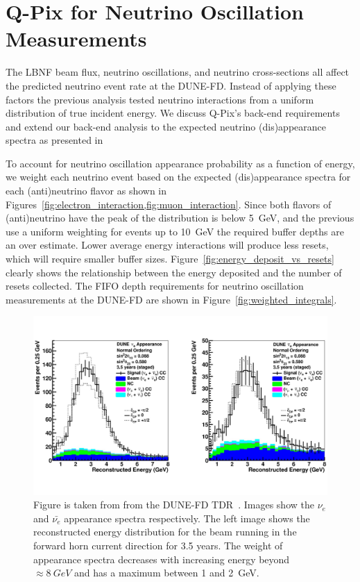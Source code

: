 \section{Q-Pix for Neutrino Oscillation Measurements}
The LBNF beam flux, neutrino oscillations, and neutrino cross-sections all affect the predicted neutrino event rate at the DUNE-FD.
Instead of applying these factors the previous analysis tested neutrino interactions from a uniform distribution of true incident energy.
We discuss Q-Pix's back-end requirements and extend our back-end analysis to the expected neutrino (dis)appearance spectra as presented in~\citep{DUNE_FD_TDRv2_2020}

To account for neutrino oscillation appearance probability as a function of energy, we weight each neutrino event based on the expected (dis)appearance spectra for each (anti)neutrino flavor as shown in Figures~\cref{fig:electron_interaction,fig:muon_interaction}.
Since both flavors of (anti)neutrino have the peak of the distribution is below 5~\unit{GeV}, and the previous use a uniform weighting for events up to 10~\unit{GeV} the required buffer depths are an over estimate.
Lower average energy interactions will produce less resets, which will require smaller buffer sizes.
Figure~\ref{fig:energy_deposit_vs_resets} clearly shows the relationship between the energy deposited and the number of resets collected.
The FIFO depth requirements for neutrino oscillation measurements at the DUNE-FD are shown in Figure~\ref{fig:weighted_integrals}.

\begin{figure}[]
\centering
\includegraphics[width=\textwidth]{images/tdr_electron_reconstruction_tdrv2.pdf}
\caption{Figure is taken from from the DUNE-FD TDR~\citep{DUNE_FD_TDRv2_2020}.
Images show the $\nu_{e}$ and $\bar{\nu_{e}}$ appearance spectra respectively.
The left image shows the reconstructed energy distribution for the beam running in the forward horn current direction for 3.5 years.
The weight of appearance spectra decreases with increasing energy beyond $\approx 8~\unit{GeV}$ and has a maximum between 1 and 2~\unit{GeV}.
}
\end{figure}~\label{fig:electron_interaction}

